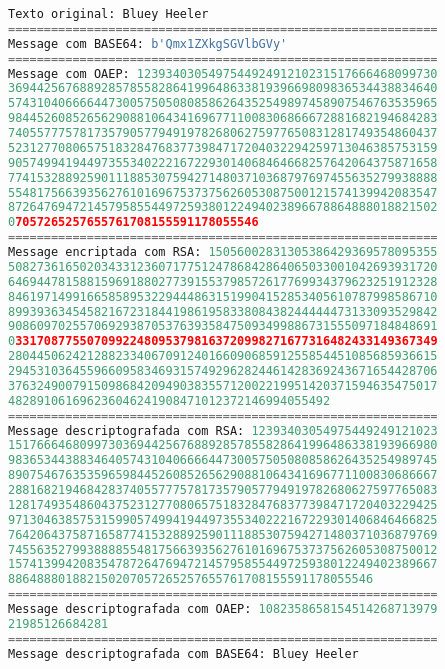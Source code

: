 \documentclass{article}
\begin{document}
\begin{lstlisting}[language=Python, breaklines=true]
Texto original: Bluey Heeler
============================================================
Message com BASE64: b'Qmx1ZXkgSGVlbGVy'
============================================================
Message com OAEP: 123934030549754492491210231517666468099730
369442567688928578558286419964863381939669809836534438834640
574310406666447300575050808586264352549897458907546763535965
984452608526562908810643416967711008306866672881682194684283
740557775781735790577949197826806275977650831281749354860437
523127708065751832847683773984717204032294259713046385753159
905749941944973553402221672293014068464668257642064375871658
774153288925901118853075942714803710368797697455635279938888
554817566393562761016967537375626053087500121574139942083547
872647694721457958554497259380122494023896678864888018821502
07057265257655761708155591178055546
============================================================
Message encriptada com RSA: 15056002831305386429369578095355
508273616502034331236071775124786842864065033001042693931720
646944781588159691880277391553798572617769934379623251912328
846197149916658589532294448631519904152853405610787998586710
899393634545821672318441986195833808438244444473133093529842
908609702557069293870537639358475093499886731555097184848691
033170877550709922480953798163720998271677316482433149367349
280445062421288233406709124016609068591255854451085685936615
294531036455966095834693157492962824461428369243671654428706
376324900791509868420949038355712002219951420371594635475017
482891061696236046241908471012372146994055492
============================================================
Message descriptografada com RSA: 12393403054975449249121023
151766646809973036944256768892857855828641996486338193966980
983653443883464057431040666644730057505080858626435254989745
890754676353596598445260852656290881064341696771100830686667
288168219468428374055777578173579057794919782680627597765083
128174935486043752312770806575183284768377398471720403229425
971304638575315990574994194497355340222167229301406846466825
764206437587165877415328892590111885307594271480371036879769
745563527993888855481756639356276101696753737562605308750012
157413994208354787264769472145795855449725938012249402389667
886488801882150207057265257655761708155591178055546
============================================================
Message descriptografada com OAEP: 1082358658154514268713979
21985126684281
============================================================
Message descriptografada com BASE64: Bluey Heeler
\end{lstlisting}
\end{document}
